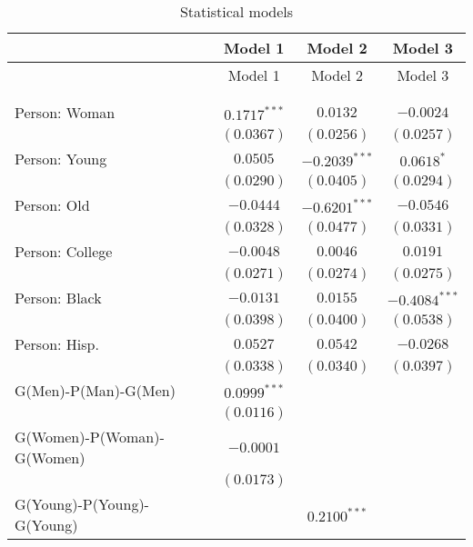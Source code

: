 
\begin{center}
\begin{longtable}{l c c c}
\toprule
 & Model 1 & Model 2 & Model 3 \\
\midrule
\endfirsthead
\toprule
 & Model 1 & Model 2 & Model 3 \\
\midrule
\endhead
\bottomrule
\endfoot
\bottomrule
\multicolumn{4}{l}{\scriptsize{$^{***}p<0.001$; $^{**}p<0.01$; $^{*}p<0.05$}}\\
\caption{Statistical models}
\label{table:coefficients}
\endlastfoot \\
Person: Woman              & $0.1717^{***}$ & $0.0132$        & $-0.0024$       \\
                           & $(0.0367)$     & $(0.0256)$      & $(0.0257)$      \\
Person: Young              & $0.0505$       & $-0.2039^{***}$ & $0.0618^{*}$    \\
                           & $(0.0290)$     & $(0.0405)$      & $(0.0294)$      \\
Person: Old                & $-0.0444$      & $-0.6201^{***}$ & $-0.0546$       \\
                           & $(0.0328)$     & $(0.0477)$      & $(0.0331)$      \\
Person: College            & $-0.0048$      & $0.0046$        & $0.0191$        \\
                           & $(0.0271)$     & $(0.0274)$      & $(0.0275)$      \\
Person: Black              & $-0.0131$      & $0.0155$        & $-0.4084^{***}$ \\
                           & $(0.0398)$     & $(0.0400)$      & $(0.0538)$      \\
Person: Hisp.              & $0.0527$       & $0.0542$        & $-0.0268$       \\
                           & $(0.0338)$     & $(0.0340)$      & $(0.0397)$      \\
G(Men)-P(Man)-G(Men)       & $0.0999^{***}$ &                 &                 \\
                           & $(0.0116)$     &                 &                 \\
G(Women)-P(Woman)-G(Women) & $-0.0001$      &                 &                 \\
                           & $(0.0173)$     &                 &                 \\
G(Young)-P(Young)-G(Young) &                & $0.2100^{***}$  &                 \\

\end{longtable}
\end{center}
